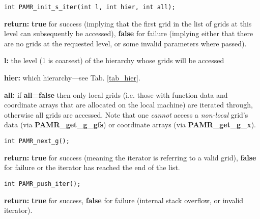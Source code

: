 \documentclass[aps,amssymb,unsortedaddress,nofootinbib]{revtex4}
\def\lsep{\itemsep 0.05in}
\begin{document}

\begin{verbatim}
int PAMR_init_s_iter(int l, int hier, int all);
\end{verbatim}
\begin{list}{}{\lsep}
\item {\bf return:} {\bf true} for success (implying that the first grid in the list
                    of grids at this level can subsequently be accessed), {\bf false} for failure 
                    (implying either that there are no grids at the requested
                    level, or some invalid parameters where passed).
\item {\bf l:} the level (1 is coarsest) of the hierarchy whose grids will be
               accessed 
\item {\bf hier:} which hierarchy---see Tab. \ref{tab_hier}.
\item {\bf all:} if {\bf all=false} then only local grids (i.e. those with function data
                 and coordinate arrays that are allocated on the local machine)
                 are iterated through, otherwise all grids are accessed. Note that 
                 one {\em cannot} access a {\em non-local} grid's data (via {\bf PAMR\_get\_g\_gfs})
                 or coordinate arrays (via {\bf PAMR\_get\_g\_x}).
\end{list}


\begin{verbatim}
int PAMR_next_g();
\end{verbatim}
\begin{list}{}{\lsep}
\item {\bf return:} {\bf true} for success (meaning the iterator is referring to a valid grid),
                    {\bf false} for failure or the iterator has reached the end of the list.
\end{list}


\begin{verbatim}
int PAMR_push_iter();
\end{verbatim}
\begin{list}{}{\lsep}
\item {\bf return:} {\bf true} for success, {\bf false} for failure (internal stack
                    overflow, or invalid iterator).
\end{list}
\end{document}

